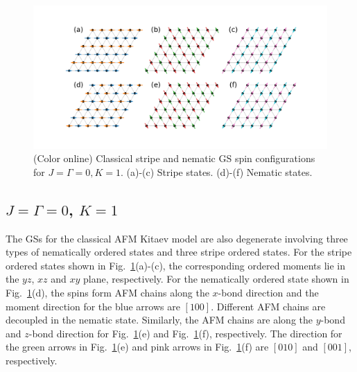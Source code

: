\documentclass[aps,prb,reprint,amsfonts,amsmath,amssymb,showpacs,groupedaddress,superscriptaddress]{revtex4-1}
\begin{document}
\begin{figure}
    \includegraphics[width=\columnwidth]{SpinConfigForPositiveKitaev.pdf}
    \caption{\label{fig:GSForPositiveK}(Color online) Classical stripe and nematic GS spin configurations for $J=\Gamma=0, K=1$. (a)-(c) Stripe states. (d)-(f) Nematic states.}
\end{figure}

\subsection{$J=\Gamma=0$, $K=1$}

The GSs for the classical AFM Kitaev model are also degenerate involving three types of nematically ordered states and three stripe ordered states. For the stripe ordered states shown in Fig.~\ref{fig:GSForPositiveK}(a)-(c), the corresponding ordered moments lie in the $yz$, $xz$ and $xy$ plane, respectively. For the nematically ordered state shown in Fig.~\ref{fig:GSForPositiveK}(d), the spins form AFM chains along the $x$-bond direction and the moment direction for the blue arrows are $[100]$. Different AFM chains are decoupled in the nematic state. Similarly, the AFM chains are along the $y$-bond and $z$-bond direction for Fig.~\ref{fig:GSForPositiveK}(e) and Fig.~\ref{fig:GSForPositiveK}(f), respectively. The direction for the green arrows in Fig.~\ref{fig:GSForPositiveK}(e) and pink arrows in Fig.~\ref{fig:GSForPositiveK}(f) are $[010]$ and $[001]$, respectively.


\end{document}
